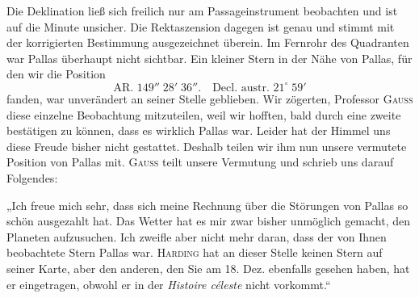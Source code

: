 \par\indent Die Deklination ließ sich freilich nur am Passageinstrument beobachten und ist auf die Minute unsicher. Die Rektaszension dagegen ist genau und stimmt mit der korrigierten Bestimmung ausgezeichnet überein. Im Fernrohr des Quadranten war Pallas überhaupt nicht sichtbar. Ein kleiner Stern in der Nähe von Pallas, für den wir die Position
\[\text{AR. }149''\;28'\;36''.\quad\text{Decl. austr. }21^\circ\;59'\]
\noindent fanden, war unverändert an seiner Stelle geblieben. Wir zögerten, Professor \textsc{Gauss} diese einzelne Beobachtung mitzuteilen, weil wir hofften, bald durch eine zweite bestätigen zu können, dass es wirklich Pallas war. Leider hat der Himmel uns diese Freude bisher nicht gestattet. Deshalb teilen wir ihm nun unsere vermutete Position von Pallas mit. \textsc{Gauss} teilt unsere Vermutung und schrieb uns darauf Folgendes:

\par\indent „Ich freue mich sehr, dass sich meine Rechnung über die Störungen von Pallas so schön ausgezahlt hat. Das Wetter hat es mir zwar bisher unmöglich gemacht, den Planeten aufzusuchen. Ich zweifle aber nicht mehr daran, dass der von Ihnen beobachtete Stern Pallas war. \textsc{Harding} hat an dieser Stelle keinen Stern auf seiner Karte, aber den anderen, den Sie am 18. Dez. ebenfalls gesehen haben, hat er eingetragen, obwohl er in der \emph{Histoire céleste} nicht vorkommt.“

